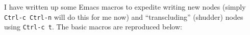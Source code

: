 \begin{node}\label{amn-0002}%
I have written up some Emacs macros to expedite writing new nodes
(simply \verb|Ctrl-c Ctrl-n| will do this for me now) and
``transcluding'' (shudder) nodes using \verb|Ctrl-c t|. The basic macros
are reproduced below:
\end{node}
